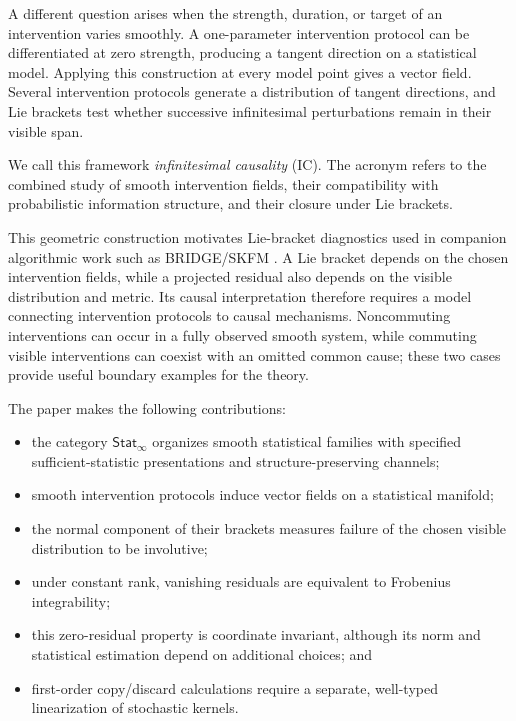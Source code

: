 \documentclass{article}
\theoremstyle{plain}
\theoremstyle{definition}
\theoremstyle{remark}
\newcommand{\StatInf}{\mathsf{Stat}_{\infty}}
\newcommand{\IC}{\textsc{IC}}
\begin{document}
A different question arises when the strength, duration, or target of an
intervention varies smoothly.  A one-parameter intervention protocol can be
differentiated at zero strength, producing a tangent direction on a statistical
model.  Applying this construction at every model point gives a vector field.
Several intervention protocols generate a distribution of tangent directions,
and Lie brackets test whether successive infinitesimal perturbations remain in
their visible span.

We call this framework \emph{infinitesimal causality} (\IC).  The acronym refers
to the combined study of smooth intervention fields, their compatibility with
probabilistic information structure, and their closure under Lie brackets.

This geometric construction motivates Lie-bracket diagnostics used in companion
algorithmic work such as BRIDGE/SKFM
\citep{mahadevan2026latentconfoundedcausaldiscovery}.  A Lie bracket depends on
the chosen intervention fields, while a projected residual also depends on the
visible distribution and metric.  Its causal interpretation therefore requires
a model connecting intervention protocols to causal mechanisms.  Noncommuting
interventions can occur in a fully observed smooth system, while commuting
visible interventions can coexist with an omitted common cause; these two cases
provide useful boundary examples for the theory.

The paper makes the following contributions:
\begin{itemize}[leftmargin=*,itemsep=2pt]
  \item the category \(\StatInf\) organizes smooth statistical families with
        specified sufficient-statistic presentations and
        structure-preserving channels;
  \item smooth intervention protocols induce vector fields on a statistical
        manifold;
  \item the normal component of their brackets measures failure of the chosen
        visible distribution to be involutive;
  \item under constant rank, vanishing residuals are equivalent to Frobenius
        integrability;
  \item this zero-residual property is coordinate invariant, although its norm
        and statistical estimation depend on additional choices; and
  \item first-order copy/discard calculations require a separate, well-typed
        linearization of stochastic kernels.
\end{itemize}
\end{document}
